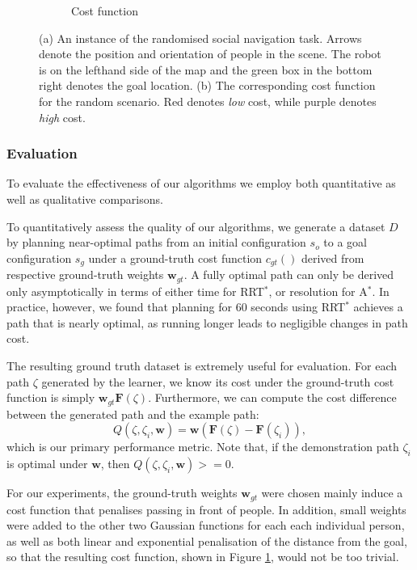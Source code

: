 \documentclass[a4paper,11pt]{report}
\begin{document}
\begin{figure}[tbh]
\begin{subfigure}[b]{0.435\columnwidth}
    \caption{Cost function}
    \label{fig:cost_f}
  \end{subfigure} 

  \caption{(a) An instance of the randomised social navigation task. Arrows denote the position and orientation of people in the scene. The robot is on the lefthand side of the map and the green box in the bottom right denotes the goal location. (b) The corresponding cost function for the random scenario. Red denotes \emph{low} cost, while purple denotes \emph{high} cost.}

  \label{fig:setting}
  \end{figure}


	\subsubsection{Evaluation}

	To evaluate the effectiveness of our algorithms we employ both quantitative as well as qualitative comparisons.

	To quantitatively assess the quality of our algorithms, we generate a dataset $D$ by planning near-optimal paths from an initial configuration $s_o$ to a goal configuration $s_g$ under a ground-truth cost function $c_{gt}()$ derived from respective ground-truth weights $\mathbf{w}_{gt}$. A fully optimal path can only be derived only asymptotically in terms of either time  for RRT$^*$, or resolution for A$^*$. In practice, however, we found that planning for 60 seconds using  RRT$^*$  achieves a path that is nearly optimal, as running longer leads to negligible changes in path cost. 

	The resulting ground truth dataset is extremely useful for evaluation. For each path $\zeta$ generated by the learner, we know its cost under the ground-truth cost function is simply  $\mathbf{w}_{gt}\mathbf{F}(\zeta)$. Furthermore, we can compute the cost difference between the generated path and the example path:
	\begin{equation}
		Q(\zeta,\zeta_i,\mathbf{w}) = \mathbf{w}(\mathbf{F}(\zeta)-\mathbf{F}(\zeta_i)), \label{eq:obj_eval}
	\end{equation}
which is our primary performance metric.  Note that, if the demonstration path $\zeta_i$ is optimal under $\mathbf{w}$, then $Q(\zeta,\zeta_i,\mathbf{w})>=0$.

For our experiments, the ground-truth weights $\mathbf{w}_{gt}$ were chosen mainly induce a cost function that penalises passing in front of people. In addition, small weights were added to the other two Gaussian functions for each each individual person, as well as both linear and exponential penalisation of the distance from the goal, so that the resulting cost function, shown in Figure \ref{fig:cost_f}, would not be too trivial. 
\end{document}
